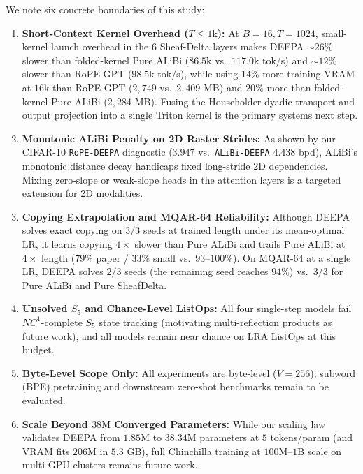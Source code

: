 \documentclass[10pt,a4paper]{article}
\begin{document}
We note six concrete boundaries of this study:
\begin{enumerate}
  \item \textbf{Short-Context Kernel Overhead ($T \le 1\text{k}$):} At $B=16, T=1024$, small-kernel launch overhead in the 6 Sheaf-Delta layers makes DEEPA $\sim 26\%$ slower than folded-kernel Pure ALiBi ($86.5\text{k}$ vs.\ $117.0\text{k}$ tok/s) and $\sim 12\%$ slower than RoPE GPT ($98.5\text{k}$ tok/s), while using $14\%$ more training VRAM at $16\text{k}$ than RoPE GPT ($2{,}749$ vs.\ $2{,}409\text{ MB}$) and $20\%$ more than folded-kernel Pure ALiBi ($2{,}284\text{ MB}$). Fusing the Householder dyadic transport and output projection into a single Triton kernel is the primary systems next step.
  \item \textbf{Monotonic ALiBi Penalty on 2D Raster Strides:} As shown by our CIFAR-10 \texttt{RoPE-DEEPA} diagnostic ($3.947$ vs.\ \texttt{ALiBi-DEEPA} $4.438$ bpd), ALiBi's monotonic distance decay handicaps fixed long-stride 2D dependencies. Mixing zero-slope or weak-slope heads in the attention layers is a targeted extension for 2D modalities.
  \item \textbf{Copying Extrapolation and MQAR-64 Reliability:} Although DEEPA solves exact copying on $3/3$ seeds at trained length under its mean-optimal LR, it learns copying $4\times$ slower than Pure ALiBi and trails Pure ALiBi at $4\times$ length ($79\%$ paper / $33\%$ small vs.\ $93\text{--}100\%$). On MQAR-64 at a single LR, DEEPA solves $2/3$ seeds (the remaining seed reaches $94\%$) vs.\ $3/3$ for Pure ALiBi and Pure SheafDelta.
  \item \textbf{Unsolved $S_5$ and Chance-Level ListOps:} All four single-step models fail $NC^1$-complete $S_5$ state tracking (motivating multi-reflection products \cite{siems2025} as future work), and all models remain near chance on LRA ListOps at this budget.
  \item \textbf{Byte-Level Scope Only:} All experiments are byte-level ($V=256$); subword (BPE) pretraining and downstream zero-shot benchmarks remain to be evaluated.
  \item \textbf{Scale Beyond $38\text{M}$ Converged Parameters:} While our scaling law validates DEEPA from $1.85\text{M}$ to $38.34\text{M}$ parameters at $5$ tokens/param (and VRAM fits $206\text{M}$ in $5.3\text{ GB}$), full Chinchilla training at $100\text{M}\text{--}1\text{B}$ scale on multi-GPU clusters remains future work.
\end{enumerate}
\end{document}
